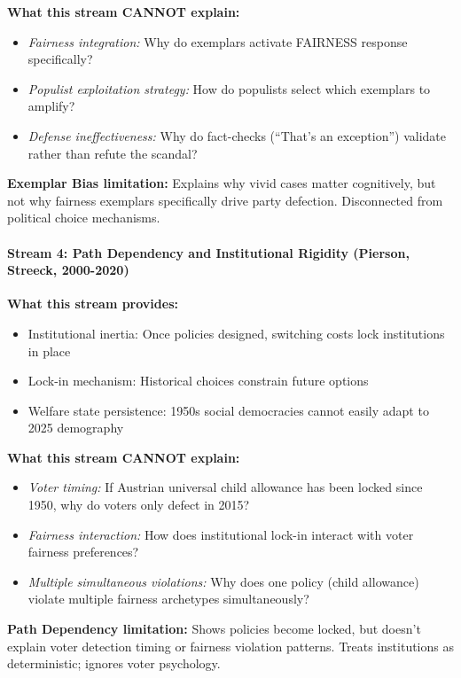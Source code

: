 \textbf{What this stream CANNOT explain:}
\begin{itemize}[nosep]
\item \textit{Fairness integration:} Why do exemplars activate FAIRNESS response specifically?
\item \textit{Populist exploitation strategy:} How do populists select which exemplars to amplify?
\item \textit{Defense ineffectiveness:} Why do fact-checks (``That's an exception'') validate rather than
refute the scandal?
\end{itemize}

\textbf{Exemplar Bias limitation:} Explains why vivid cases matter cognitively, but not why
fairness exemplars specifically drive party defection. Disconnected from political choice mechanisms.

\paragraph{Stream 4: Path Dependency and Institutional Rigidity (Pierson, Streeck, 2000-2020)}

\textbf{What this stream provides:}
\begin{itemize}[nosep]
\item Institutional inertia: Once policies designed, switching costs lock institutions in place
\item Lock-in mechanism: Historical choices constrain future options
\item Welfare state persistence: 1950s social democracies cannot easily adapt to 2025 demography
\end{itemize}

\textbf{What this stream CANNOT explain:}
\begin{itemize}[nosep]
\item \textit{Voter timing:} If Austrian universal child allowance has been locked since 1950,
why do voters only defect in 2015?
\item \textit{Fairness interaction:} How does institutional lock-in interact with voter fairness preferences?
\item \textit{Multiple simultaneous violations:} Why does one policy (child allowance) violate
multiple fairness archetypes simultaneously?
\end{itemize}

\textbf{Path Dependency limitation:} Shows policies become locked, but doesn't explain voter
detection timing or fairness violation patterns. Treats institutions as deterministic; ignores
voter psychology.

